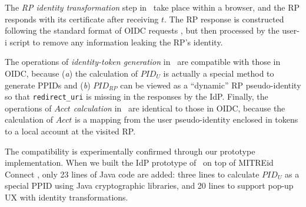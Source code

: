 The \emph{RP identity transformation} step in \usso\ take place within a browser,
            and the RP responds with its certificate after receiving $t$.
The RP response is constructed following the standard format of OIDC requests \cite{dimvaLiM16},
    but then processed by the user-i script to remove any information leaking the RP's identity.

The operations of \emph{identity-token generation} in \usso\ are compatible with those in OIDC,
 because (\emph{a}) the calculation of $PID_U$ is actually a special method to generate PPIDs and (\emph{b}) $PID_{RP}$ can be viewed as a ``dynamic'' RP pseudo-identity
    so that \texttt{redirect\_uri} is missing in the responses by the IdP.
%
Finally, the operations of \emph{$Acct$ calculation} in \usso\ are identical to those in OIDC,
 because the calculation of $Acct$ is a mapping from the user pseudo-identity enclosed in tokens to a local account at the visited RP.

The compatibility is experimentally confirmed through our prototype implementation.
When we built the IdP prototype of \usso\ on top of MITREid Connect \cite{MITREid},
    only 23 lines of Java code are added:
        three lines to calculate $PID_U$ as a special PPID using Java cryptographic libraries,
    and 20 lines to support pop-up UX with identity transformations.
